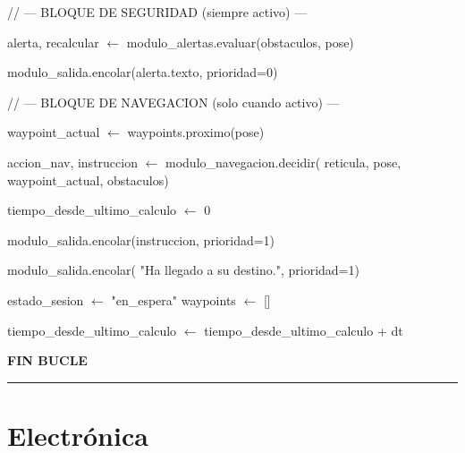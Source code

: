 \begin{algorithmic}[1]
\Statex
\Statex \hspace{0.5cm} // --- BLOQUE DE SEGURIDAD (siempre activo) ---

\State alerta, recalcular $\gets$
modulo\_alertas.evaluar(obstaculos, pose)


    \State modulo\_salida.encolar(alerta.texto, prioridad=0)

\EndIf

\Statex
\Statex \hspace{0.5cm} // --- BLOQUE DE NAVEGACION (solo cuando activo) ---



        \State waypoint\_actual $\gets$ waypoints.proximo(pose)

        \State accion\_nav, instruccion $\gets$
        modulo\_navegacion.decidir(
        \Statex \hspace{2.3cm} reticula, pose,
        \Statex \hspace{2.3cm} waypoint\_actual, obstaculos)

        \State tiempo\_desde\_ultimo\_calculo $\gets$ 0

        \State modulo\_salida.encolar(instruccion, prioridad=1)

    \EndIf

    \Statex


        \State modulo\_salida.encolar(
        \Statex \hspace{2.3cm} "Ha llegado a su destino.", prioridad=1)

        \State estado\_sesion $\gets$ "en\_espera"
        \State waypoints $\gets$ []

    \EndIf

\EndIf

\Statex

\State tiempo\_desde\_ultimo\_calculo $\gets$
tiempo\_desde\_ultimo\_calculo + dt

\Statex
\Statex \textbf{FIN BUCLE}

\end{algorithmic}
\vspace{-0.9cm}
\rule{\textwidth}{0.4pt}

\section{Electrónica}

